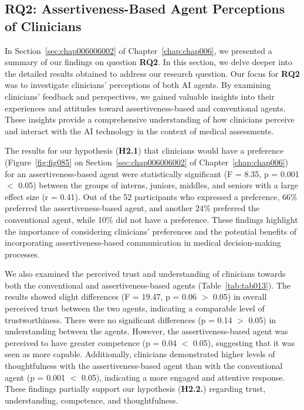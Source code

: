 \subsection{RQ2: Assertiveness-Based Agent Perceptions of Clinicians}
\label{sec:app005007002}

In Section~\ref{sec:chap006006002} of Chapter~\ref{chap:chap006}, we presented a summary of our findings on question {\bf RQ2}.
In this section, we delve deeper into the detailed results obtained to address our research question. Our focus for {\bf RQ2} was to investigate clinicians' perceptions of both \ac{AI} agents.
By examining clinicians' feedback and perspectives, we gained valuable insights into their experiences and attitudes toward assertiveness-based and conventional agents.
These insights provide a comprehensive understanding of how clinicians perceive and interact with the \ac{AI} technology in the context of medical assessments.

The results for our hypothesis ({\bf H2.1}) that clinicians would have a preference (Figure~\ref{fig:fig085} on Section~\ref{sec:chap006006002} of Chapter~\ref{chap:chap006}) for an assertiveness-based agent were statistically significant (F = 8.35, p = 0.001 $<$ 0.05) between the groups of interns, juniors, middles, and seniors with a large effect size (r = 0.41).
Out of the 52 participants who expressed a preference, 66\% preferred the assertiveness-based agent, and another 24\% preferred the conventional agent, while 10\% did not have a preference.
These findings highlight the importance of considering clinicians' preferences and the potential benefits of incorporating assertiveness-based communication in medical decision-making processes.

We also examined the perceived trust and understanding of clinicians towards both the conventional and assertiveness-based agents (Table~\ref{tab:tab013}).
The results showed slight differences (F = 19.47, p = 0.06 $>$ 0.05) in overall perceived trust between the two agents, indicating a comparable level of trustworthiness.
There were no significant differences (p = 0.14 $>$ 0.05) in understanding between the agents.
However, the assertiveness-based agent was perceived to have greater competence (p = 0.04 $<$ 0.05), suggesting that it was seen as more capable.
Additionally, clinicians demonstrated higher levels of thoughtfulness with the assertiveness-based agent than with the conventional agent (p = 0.001 $<$ 0.05), indicating a more engaged and attentive response.
These findings partially support our hypothesis ({\bf H2.2.}) regarding trust, understanding, competence, and thoughtfulness.

